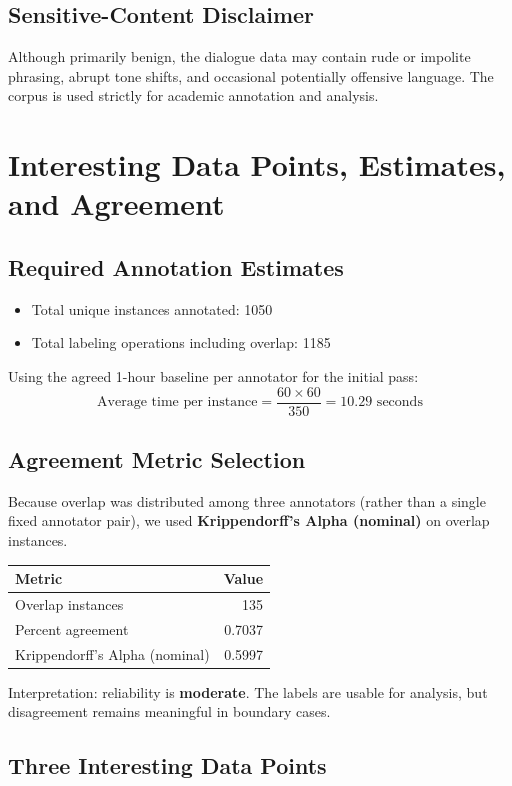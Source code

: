 \documentclass[11pt]{article}
\begin{document}
\subsection{Sensitive-Content Disclaimer}
Although primarily benign, the dialogue data may contain rude or impolite phrasing, abrupt tone shifts, and occasional potentially offensive language. The corpus is used strictly for academic annotation and analysis.

\section{Interesting Data Points, Estimates, and Agreement}
\subsection{Required Annotation Estimates}
\begin{itemize}
  \item Total unique instances annotated: 1050
  \item Total labeling operations including overlap: 1185
\end{itemize}

Using the agreed 1-hour baseline per annotator for the initial pass:
\[
\text{Average time per instance}=\frac{60 \times 60}{350}=10.29\text{ seconds}
\]

\subsection{Agreement Metric Selection}
Because overlap was distributed among three annotators (rather than a single fixed annotator pair), we used \textbf{Krippendorff's Alpha (nominal)} on overlap instances.

\begin{center}
\begin{tabular}{lr}
\toprule
\textbf{Metric} & \textbf{Value} \\
\midrule
Overlap instances & 135 \\
Percent agreement & 0.7037 \\
Krippendorff's Alpha (nominal) & 0.5997 \\
\bottomrule
\end{tabular}
\end{center}

Interpretation: reliability is \textbf{moderate}. The labels are usable for analysis, but disagreement remains meaningful in boundary cases.

\subsection{Three Interesting Data Points}
\end{document}
